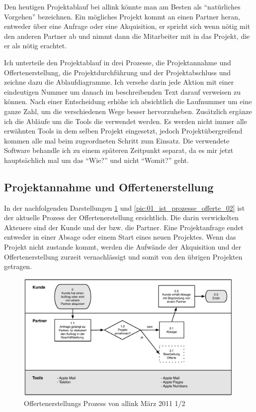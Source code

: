 Den heutigen Projektablauf bei allink könnte man am Besten als ``natürliches Vorgehen''
bezeichnen. Ein mögliches Projekt kommt an einen Partner heran, entweder über 
eine Anfrage oder eine Akquisition, er spricht sich wenn nötig mit den anderen 
Partner ab und nimmt dann die Mitarbeiter mit in das Projekt, die er als nötig erachtet.

Ich unterteile den Projektablauf in drei Prozesse, die Projektannahme und Offertenerstellung,
die Projektdurchführung und der Projektabschluss und zeichne dazu die Ablaufdiagramme.
Ich versehe darin jede Aktion mit einer eindeutigen Nummer um danach im 
beschreibenden Text darauf verweisen zu können. Nach einer Entscheidung erhöhe
ich absichtlich die Laufnummer um eine ganze Zahl, um die verschiedenen Wege
besser hervorzuheben. Zusätzlich ergänze ich die Abläufe um die Tools die
verwendet werden. Es werden nicht immer alle erwähnten Tools in dem selben Projekt eingesetzt,
jedoch Projektübergreifend kommen alle mal beim zugeordneten Schritt zum Einsatz. 
Die verwendete Software behandle ich zu einem späteren Zeitpunkt separat, da es 
mir jetzt hauptsächlich mal um das ``Wie?'' und nicht ``Womit?'' geht.

\subsection{Projektannahme und Offertenerstellung}
In der nachfolgenden Darstellungen \ref{pic:01_ist_prozesse_offerte_01} und
\ref{pic:01_ist_prozesse_offerte_02} ist der
aktuelle Prozess der Offertenerstellung ersichtlich. Die darin verwickelten
Akteuere sind der Kunde und der bzw. die Partner.
Eine Projektanfrage endet entweder in einer Absage oder einem Start eines neuen 
Projektes. Wenn das Projekt nicht zustande kommt, werden die Aufwände der
Akquisition und der Offertenerstellung zurzeit vernachlässigt und somit von
den übrigen Projekten getragen.

\begin{figure}[htbp]
\begin{center}
\includegraphics[width=0.99\textwidth,angle=0]{./bilder/analyse/01_ist_prozesse_offerte_01.pdf}
\caption{Offertenerstellungs Prozess von allink März 2011 1/2}
\label{pic:01_ist_prozesse_offerte_01}
\end{center}
\end{figure}

